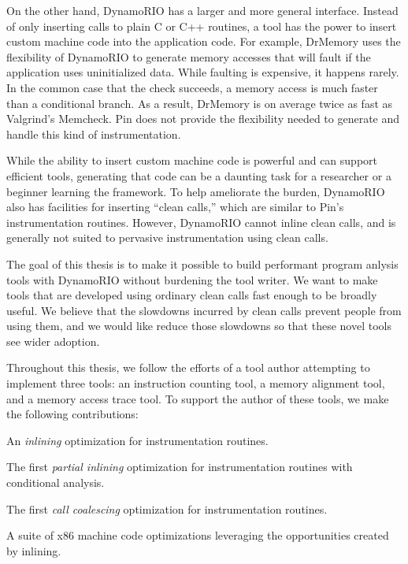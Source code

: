 On the other hand, DynamoRIO\cite{bruening_phd} has a larger and more general
interface.  Instead of only inserting calls to plain C or C++ routines, a tool
has the power to insert custom machine code into the application code.  For
example, DrMemory uses the flexibility of DynamoRIO to generate memory accesses
that will fault if the application uses uninitialized data.  While faulting is
expensive, it happens rarely.  In the common case that the check succeeds, a
memory access is much faster than a conditional branch.  As a result, DrMemory
is on average twice as fast as Valgrind's Memcheck.\cite{drmemory}  Pin does not
provide the flexibility needed to generate and handle this kind of
instrumentation.

While the ability to insert custom machine code is powerful and can support
efficient tools, generating that code can be a daunting task for a researcher or
a beginner learning the framework.  To help ameliorate the burden, DynamoRIO
also has facilities for inserting ``clean calls,'' which are similar to Pin's
instrumentation routines.  However, DynamoRIO cannot inline clean calls, and is
generally not suited to pervasive instrumentation using clean calls.

The goal of this thesis is to make it possible to build performant program
anlysis tools with DynamoRIO without burdening the tool writer.  We want to make
tools that are developed using ordinary clean calls fast enough to be broadly
useful.  We believe that the slowdowns incurred by clean calls prevent people
from using them, and we would like reduce those slowdowns so that these novel
tools see wider adoption.


Throughout this thesis, we follow the efforts of a tool author attempting to
implement three tools: an instruction counting tool, a memory alignment tool,
and a memory access trace tool.  To support the author of these tools, we make
the following contributions:

\begin{packed_itemize}
\item An {\em inlining} optimization for instrumentation routines.
\item The first {\em partial inlining} optimization for instrumentation
routines with conditional analysis.
\item The first {\em call coalescing} optimization for instrumentation
routines.
\item A suite of x86 machine code optimizations leveraging the opportunities
created by inlining.
\end{packed_itemize}

